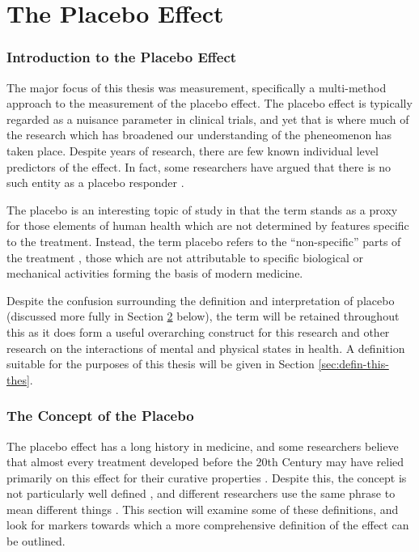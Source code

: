 \part{The Placebo Effect}

\section{Introduction to the Placebo Effect}
\label{sec:intr-plac-effect}


The major focus of this thesis was measurement, specifically a multi-method approach to the measurement of the placebo effect. The placebo effect is typically regarded as a nuisance parameter in clinical trials, and yet that is where much of the research which has broadened our understanding of the pheneomenon has taken place. Despite years of research, there are few known individual level predictors of the effect. In fact, some researchers have argued that there is no such entity as a placebo responder \cite{Kaptchuk2008a} . 

The placebo is an interesting topic of study in that the term stands as a proxy for those elements of human health which are not determined by  features specific to the treatment. Instead, the term placebo refers to the ``non-specific'' parts of the treatment \cite{grunbaum1981placebo}, those which are not attributable to  specific biological or mechanical activities forming the basis of modern medicine. 

Despite the confusion surrounding the definition and interpretation of placebo (discussed more fully in Section \ref{sec:concept-placebo} below), the term will be retained throughout this  as it does form a useful overarching construct for this research and other research on the interactions of mental and physical states in health. A definition suitable for the purposes of this thesis will be given in Section \ref{sec:defin-this-thes}.

\section{The Concept of the Placebo}
\label{sec:concept-placebo}

The placebo effect has a long history in medicine, and some researchers believe that almost every treatment developed before the 20th Century may have relied primarily on this effect for their curative properties \cite{Shapiro1997,Macedo2003} . Despite this, the concept is not particularly well defined , and different researchers use the same phrase to mean different things \cite{Ernst1995b,hrobjartsson1996uncontrollable} . This section will examine some of these definitions, and look for markers towards which  a more comprehensive definition of the effect can be outlined.  

